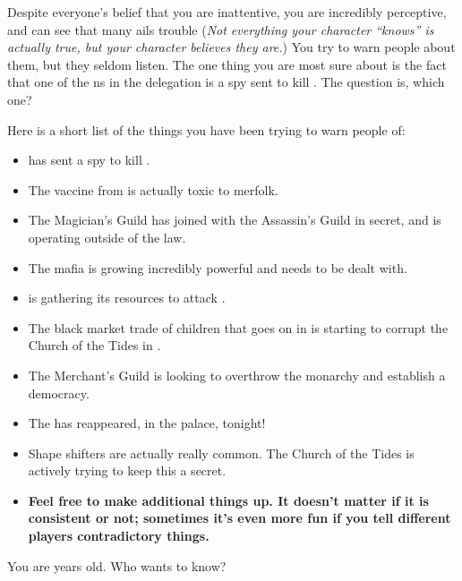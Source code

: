 \documentclass[char]{NeptuneBall}
\begin{document}
Despite everyone's belief that you are inattentive, you are incredibly perceptive, and can see that many ails trouble \pAtlantis{} (\emph{Not everything your character ``knows'' is actually true, but your character believes they are.}) You try to warn people about them, but they seldom listen. The one thing you are most sure about is the fact that one of the \pPacifica{}ns in the delegation is a spy sent to kill \cKing{}. The question is, which one?

Here is a short list of the things you have been trying to warn people of:
\begin{itemize}
 \item \pPacifica{} has sent a spy to kill \cKing{}.
 \item The \ppolio{} vaccine from \pAmerica{} is actually toxic to merfolk.
 \item The Magician's Guild has joined with the Assassin's Guild in secret, and is operating outside of the law.
 \item The mafia is growing incredibly powerful and needs to be dealt with.
 \item \pIndia{} is gathering its resources to attack \pAtlantis{}.
 \item The black market trade of children that goes on in \pPacifica{} is starting to corrupt the Church of the Tides in \pAtlantis{}.
 \item The Merchant's Guild is looking to overthrow the monarchy and establish a democracy.
 \item The \iWishingStone{\MYname} has reappeared, in the palace, tonight!
 \item Shape shifters are actually really common. The Church of the Tides is actively trying to keep this a secret.
 \item {\bf Feel free to make additional things up. It doesn't matter if it is consistent or not; sometimes it's even more fun if you tell different players contradictory things.}
\end{itemize}

\begin{itemz}[Trivia]
  \item You are \cOsiris{\MYnumber} years old. Who wants to know?
\end{itemz}
\end{document}
